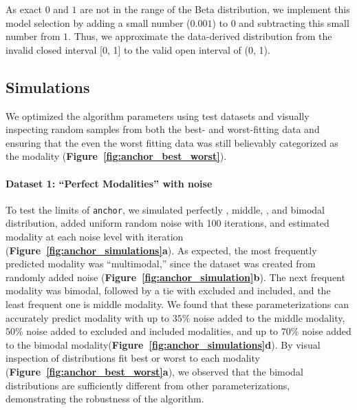 As exact $0$ and $1$ are not in the range of the Beta distribution, we implement this model selection by adding a small number ($0.001$) to $0$ and subtracting this small number from $1$. Thus, we approximate the data-derived distribution from the invalid closed interval [0, 1] to the valid open interval of (0, 1).


\subsection{Simulations}

We optimized the algorithm parameters using test datasets and visually inspecting random samples from both the best- and worst-fitting data and ensuring that the even the worst fitting data was still believably categorized as the modality (\textbf{Figure~\ref{fig:anchor_best_worst}}).

\paragraph{Dataset 1: ``Perfect Modalities'' with noise}
\label{sec:anchor_perfect_modalities}

To test the limits of \texttt{anchor}, we simulated perfectly \0, middle, \1, and bimodal distribution, added uniform random noise with 100 iterations, and estimated modality at each noise level with iteration (\textbf{Figure~\ref{fig:anchor_simulations}a}). As expected, the most frequently predicted modality was ``multimodal,'' since the dataset was created from randomly added noise (\textbf{Figure~\ref{fig:anchor_simulation}b}). The next frequent modality was bimodal, followed by a tie with excluded and included, and the least frequent one is middle modality. We found that these parameterizations can accurately predict modality with up to $35\%$ noise added to the middle modality, $50\%$ noise added to excluded and included modalities, and up to $70\%$ noise added to the bimodal modality(\textbf{Figure~\ref{fig:anchor_simulations}d}). By visual inspection of distributions fit best or worst to each modality (\textbf{Figure~\ref{fig:anchor_best_worst}a}), we observed that the bimodal distributions are sufficiently different from other parameterizations, demonstrating the robustness of the algorithm.



